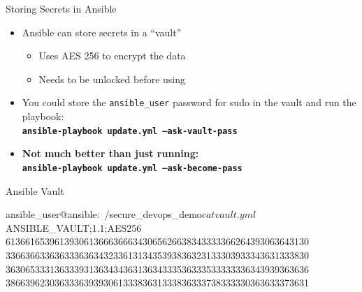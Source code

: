 \documentclass[aspectratio=169,12pt]{beamer}
\begin{document}
\begin{frame}{Storing Secrets in Ansible}
\begin{itemize}
  \item Ansible can store secrets in a ``vault''
  \begin{itemize}
    \item Uses AES 256 to encrypt the data
    \item Needs to be unlocked before using
  \end{itemize}
  \vspace{0.3cm}
  \item You could store the \texttt{ansible\_user} password for sudo in the vault and run the playbook:\\
    \textbf{\texttt{ansible-playbook update.yml --ask-vault-pass}}
  \vspace{0.3cm}
  \item \textbf{Not much better than just running:}\\
    \textbf{\texttt{ansible-playbook update.yml --ask-become-pass}}
\end{itemize}
\end{frame}

\begin{frame}[fragile]{Ansible Vault}
\vspace{0.3cm}
\begin{termsmall}
ansible_user@ansible:~/secure_devops_demo$ cat vault.yml
$ANSIBLE_VAULT;1.1;AES256
61366165396139306136663666343065626638343333366264393063643130
33663663363633363634323361313435393836323133303933343631333830
36306533313633393136343436313634333536333533333336343939363636
38663962303633363939306133383631333836333738333330363633373631
\end{termsmall}
\end{frame}
\end{document}
